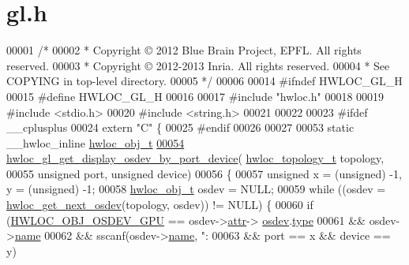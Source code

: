 \hypertarget{a00164_source}{}\section{gl.\+h}
\label{a00164_source}

\begin{DoxyCode}
00001 \textcolor{comment}{/*}
00002 \textcolor{comment}{ * Copyright © 2012 Blue Brain Project, EPFL. All rights reserved.}
00003 \textcolor{comment}{ * Copyright © 2012-2013 Inria.  All rights reserved.}
00004 \textcolor{comment}{ * See COPYING in top-level directory.}
00005 \textcolor{comment}{ */}
00006 
00014 \textcolor{preprocessor}{#ifndef HWLOC\_GL\_H}
00015 \textcolor{preprocessor}{#define HWLOC\_GL\_H}
00016 
00017 \textcolor{preprocessor}{#include "hwloc.h"}
00018 
00019 \textcolor{preprocessor}{#include <stdio.h>}
00020 \textcolor{preprocessor}{#include <string.h>}
00021 
00022 
00023 \textcolor{preprocessor}{#ifdef \_\_cplusplus}
00024 \textcolor{keyword}{extern} \textcolor{stringliteral}{"C"} \{
00025 \textcolor{preprocessor}{#endif}
00026 
00027 
00053 \textcolor{keyword}{static} \_\_hwloc\_inline \hyperlink{a00238}{hwloc\_obj\_t}
\hyperlink{a00223_ga4d66a77e4fe4051d6e5b772c1b8fcec5}{00054} \hyperlink{a00223_ga4d66a77e4fe4051d6e5b772c1b8fcec5}{hwloc\_gl\_get\_display\_osdev\_by\_port\_device}(
      \hyperlink{a00186_ga9d1e76ee15a7dee158b786c30b6a6e38}{hwloc\_topology\_t} topology,
00055                                           \textcolor{keywordtype}{unsigned} port, \textcolor{keywordtype}{unsigned} device)
00056 \{
00057         \textcolor{keywordtype}{unsigned} x = (unsigned) -1, y = (\textcolor{keywordtype}{unsigned}) -1;
00058         \hyperlink{a00238}{hwloc\_obj\_t} osdev = NULL;
00059         \textcolor{keywordflow}{while} ((osdev = \hyperlink{a00204_ga8b4584c8949e2c5f1c97ba7fe92b8145}{hwloc\_get\_next\_osdev}(topology, osdev)) != NULL) \{
00060                 \textcolor{keywordflow}{if} (\hyperlink{a00184_gga64f5d539df299c97ae80ce53fc4b56c0aa3a09798ef2836abb236dc3a645ffc90}{HWLOC\_OBJ\_OSDEV\_GPU} == osdev->\hyperlink{a00238_accd40e29f71f19e88db62ea3df02adc8}{attr}->
      \hyperlink{a00242_a22904c25fe44b323bab5c9bc52660fca}{osdev}.\hyperlink{a00282_a31e019e27e54ac6138d04be639bb96f9}{type}
00061                     && osdev->\hyperlink{a00238_abb709ec38f2970677e4e57d1d30be96d}{name}
00062                     && sscanf(osdev->\hyperlink{a00238_abb709ec38f2970677e4e57d1d30be96d}{name}, \textcolor{stringliteral}{":%
00063                     && port == x && device == y)
}
\end{DoxyCode}
